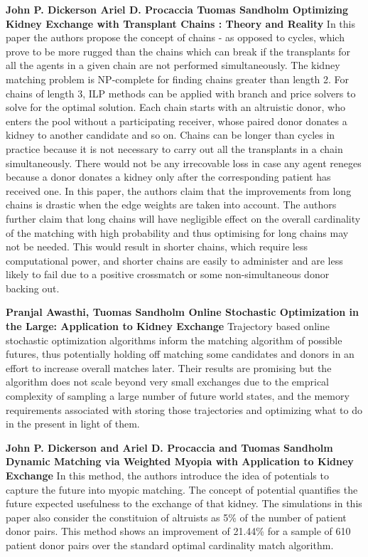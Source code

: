 \par 
\textbf{John P. Dickerson Ariel D. Procaccia Tuomas Sandholm  Optimizing Kidney Exchange with Transplant Chains : Theory and Reality} \cite{vijay2}
In this paper the authors propose the concept of chains - as opposed to cycles, which prove to be more rugged than the chains which can break if the transplants for all the agents in a given chain are not performed simultaneously. The kidney matching problem is NP-complete for finding chains greater than length 2. For chains of length 3, ILP methods can be applied with branch and price solvers to solve for the optimal solution. Each chain starts with an altruistic donor, who enters the pool without a participating receiver, whose paired donor donates a kidney to another candidate and so on. Chains can be longer than cycles in practice because it is not necessary to carry out all the transplants in a chain simultaneously. There would not be any irrecovable loss in case any agent reneges because a donor donates a kidney only after the corresponding patient has received one. In this paper, the authors claim that the improvements from long chains is drastic when the edge weights are taken into account. The authors further claim that long chains will have negligible effect on the overall cardinality of the matching with high probability and thus optimising for long chains may not be needed. This would result in shorter chains, which require less computational power, and shorter chains are easily to administer and are less likely to fail due to a positive crossmatch or some non-simultaneous donor backing out.

\textbf{Pranjal Awasthi, Tuomas Sandholm Online Stochastic Optimization in the Large: Application to Kidney Exchange}\cite{vijay3}
Trajectory based online stochastic optimization algorithms inform the matching algorithm of possible futures, thus potentially holding off matching some candidates and donors in an effort to increase overall matches later. Their results are promising but the algorithm does not scale beyond very small exchanges due to the emprical complexity of sampling a large number of future world states, and the memory requirements associated with storing those trajectories and optimizing what to do in the present in light of them.


\textbf{John P. Dickerson and Ariel D. Procaccia and Tuomas Sandholm Dynamic Matching via Weighted Myopia with Application to Kidney Exchange }\cite{vijay4}
In this method, the authors introduce the idea of potentials to capture the future into myopic matching. The concept of potential quantifies the future expected usefulness to the exchange of that kidney. The simulations in this paper also consider the constituion of altruists as 5\% of the number of patient donor pairs. This method shows an improvement of 21.44\% for a sample of 610 patient donor pairs over the standard optimal cardinality match algorithm.

